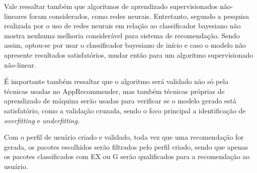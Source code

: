 Vale ressaltar também que algoritmos de aprendizado supervisionados não-lineares foram considerados, como redes neurais. Entretanto, segundo
a pesquisa realizada por \cite{pazzani1997learning} o uso de redes neurais em relação ao classificador bayesiano não mostra nenhuma melhoria
considerável para sistema de recomendação. Sendo assim, optou-se por usar o classificador bayesiano de início e caso o modelo não apresente
resultados satisfatórios, mudar então para um algoritmo supervisionado não-linear.

É importante também ressaltar que o algoritmo será validado não só pela técnicas usadas no AppRecommender, mas também técnicas próprias de
aprendizado de máquina serão usadas para verificar se o modelo gerado está satisfatório, como a validação cruzada, sendo o foco principal a
identificação de \textit{overfitting} e \textit{underfitting}.

Com o perfil de usuário criado e validado, toda vez que uma recomendação for gerada, os pacotes escolhidos serão filtrados pelo perfil criado,
sendo que apenas os pacotes classificados com EX ou G serão qualificados para a recomendação ao usuário.
